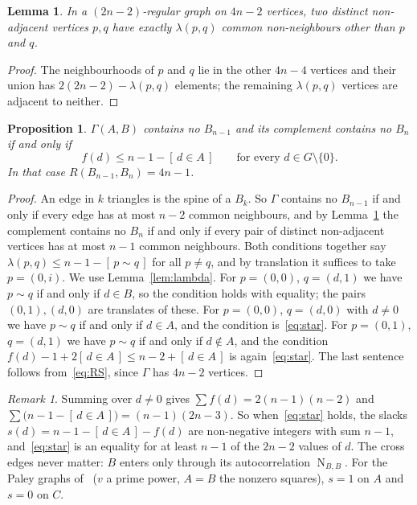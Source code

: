 \documentclass[11pt]{amsart}
\newtheorem{proposition}[theorem]{Proposition}
\newtheorem{lemma}[theorem]{Lemma}
\theoremstyle{definition}
\theoremstyle{remark}
\newtheorem{remark}[theorem]{Remark}
\numberwithin{equation}{section}
\newcommand{\NN}{\operatorname{N}}
\newcommand{\ind}[1]{[\,#1\,]}
\begin{document}
\begin{lemma}\label{lem:regular}
In a $(2n-2)$-regular graph on $4n-2$ vertices, two distinct non-adjacent vertices $p,q$ have exactly $\lambda(p,q)$ common non-neighbours other than $p$ and $q$.
\end{lemma}

\begin{proof}
The neighbourhoods of $p$ and $q$ lie in the other $4n-4$ vertices and their union has $2(2n-2)-\lambda(p,q)$ elements; the remaining $\lambda(p,q)$ vertices are adjacent to neither.
\end{proof}

\begin{proposition}\label{prop:star}
$\Gamma(A,B)$ contains no $B_{n-1}$ and its complement contains no $B_n$ if and only if
\begin{equation}\label{eq:star}
f(d)\le n-1-\ind{d\in A}\qquad\text{for every } d\in G\setminus\{0\}.
\end{equation}
In that case $R(B_{n-1},B_n)=4n-1$.
\end{proposition}

\begin{proof}
An edge in $k$ triangles is the spine of a $B_k$. So $\Gamma$ contains no $B_{n-1}$ if and only if every edge has at most $n-2$ common neighbours, and by Lemma~\ref{lem:regular} the complement contains no $B_n$ if and only if every pair of distinct non-adjacent vertices has at most $n-1$ common neighbours. Both conditions together say $\lambda(p,q)\le n-1-\ind{p\sim q}$ for all $p\ne q$, and by translation it suffices to take $p=(0,i)$. We use Lemma~\ref{lem:lambda}. For $p=(0,0)$, $q=(d,1)$ we have $p\sim q$ if and only if $d\in B$, so the condition holds with equality; the pairs $(0,1),(d,0)$ are translates of these. For $p=(0,0)$, $q=(d,0)$ with $d\ne0$ we have $p\sim q$ if and only if $d\in A$, and the condition is~\eqref{eq:star}. For $p=(0,1)$, $q=(d,1)$ we have $p\sim q$ if and only if $d\notin A$, and the condition $f(d)-1+2\ind{d\in A}\le n-2+\ind{d\in A}$ is again~\eqref{eq:star}. The last sentence follows from~\eqref{eq:RS}, since $\Gamma$ has $4n-2$ vertices.
\end{proof}

\begin{remark}\label{rem:slack}
Summing over $d\ne0$ gives $\sum f(d)=2(n-1)(n-2)$ and $\sum\big(n-1-\ind{d\in A}\big)=(n-1)(2n-3)$. So when~\eqref{eq:star} holds, the slacks $s(d)=n-1-\ind{d\in A}-f(d)$ are non-negative integers with sum $n-1$, and~\eqref{eq:star} is an equality for at least $n-1$ of the $2n-2$ values of $d$. The cross edges never matter: $B$ enters only through its autocorrelation $\NN_{B,B}$. For the Paley graphs of~\cite{We} ($v$ a prime power, $A=B$ the nonzero squares), $s=1$ on $A$ and $s=0$ on $C$.
\end{remark}
\end{document}
